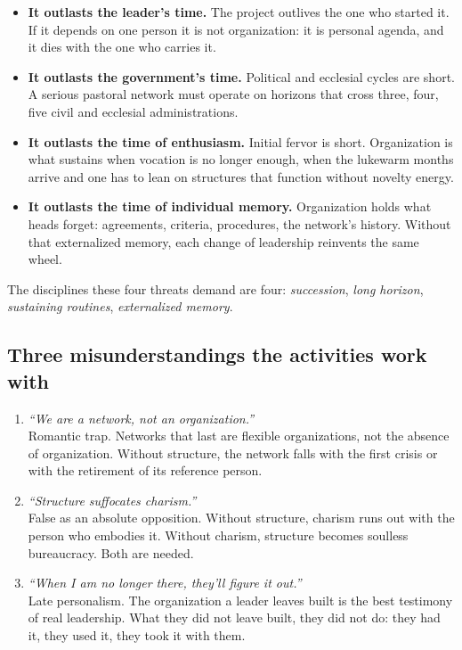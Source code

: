 \documentclass[11pt, a4paper]{article}
\begin{document}
\begin{itemize}
  \item \textbf{It outlasts the leader's time.} The project outlives the one who started it. If it depends on one person it is not organization: it is personal agenda, and it dies with the one who carries it.
  \item \textbf{It outlasts the government's time.} Political and ecclesial cycles are short. A serious pastoral network must operate on horizons that cross three, four, five civil and ecclesial administrations.
  \item \textbf{It outlasts the time of enthusiasm.} Initial fervor is short. Organization is what sustains when vocation is no longer enough, when the lukewarm months arrive and one has to lean on structures that function without novelty energy.
  \item \textbf{It outlasts the time of individual memory.} Organization holds what heads forget: agreements, criteria, procedures, the network's history. Without that externalized memory, each change of leadership reinvents the same wheel.
\end{itemize}

The disciplines these four threats demand are four: \emph{succession}, \emph{long horizon}, \emph{sustaining routines}, \emph{externalized memory}.

\subsection*{Three misunderstandings the activities work with}

\begin{enumerate}[label={\color{organizacionVerde}\arabic*.}]
  \item \emph{``We are a network, not an organization.''} \\
        Romantic trap. Networks that last are flexible organizations, not the absence of organization. Without structure, the network falls with the first crisis or with the retirement of its reference person.
  \item \emph{``Structure suffocates charism.''} \\
        False as an absolute opposition. Without structure, charism runs out with the person who embodies it. Without charism, structure becomes soulless bureaucracy. Both are needed.
  \item \emph{``When I am no longer there, they'll figure it out.''} \\
        Late personalism. The organization a leader leaves built is the best testimony of real leadership. What they did not leave built, they did not do: they had it, they used it, they took it with them.
\end{enumerate}
\end{document}
